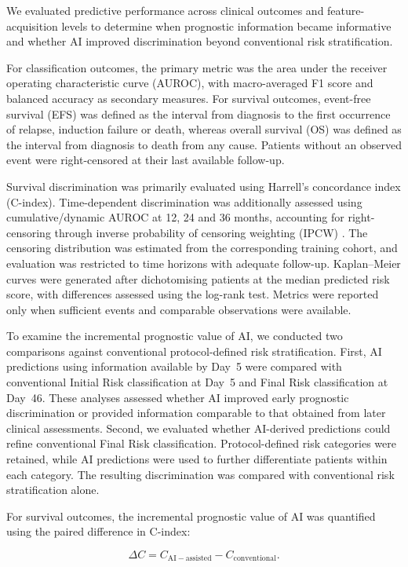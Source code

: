 \documentclass[pdflatex,sn-nature]{sn-jnl}
\begin{document}
We evaluated predictive performance across clinical outcomes and feature-acquisition levels to determine when prognostic information became informative and whether AI improved discrimination beyond conventional risk stratification.

For classification outcomes, the primary metric was the area under the receiver operating characteristic curve (AUROC), with macro-averaged F1 score and balanced accuracy as secondary measures. For survival outcomes, event-free survival (EFS) was defined as the interval from diagnosis to the first occurrence of relapse, induction failure or death, whereas overall survival (OS) was defined as the interval from diagnosis to death from any cause. Patients without an observed event were right-censored at their last available follow-up.

Survival discrimination was primarily evaluated using Harrell's concordance index (C-index). Time-dependent discrimination was additionally assessed using cumulative/dynamic AUROC at 12, 24 and 36 months, accounting for right-censoring through inverse probability of censoring weighting (IPCW) \cite{Uno2007}. The censoring distribution was estimated from the corresponding training cohort, and evaluation was restricted to time horizons with adequate follow-up. Kaplan--Meier curves were generated after dichotomising patients at the median predicted risk score, with differences assessed using the log-rank test. Metrics were reported only when sufficient events and comparable observations were available.

To examine the incremental prognostic value of AI, we conducted two comparisons against conventional protocol-defined risk stratification. First, AI predictions using information available by Day~5 were compared with conventional Initial Risk classification at Day~5 and Final Risk classification at Day~46. These analyses assessed whether AI improved early prognostic discrimination or provided information comparable to that obtained from later clinical assessments. Second, we evaluated whether AI-derived predictions could refine conventional Final Risk classification. Protocol-defined risk categories were retained, while AI predictions were used to further differentiate patients within each category. The resulting discrimination was compared with conventional risk stratification alone.

For survival outcomes, the incremental prognostic value of AI was quantified using the paired difference in C-index:

\begin{equation}
\Delta C =
C_{\mathrm{AI-assisted}} -
C_{\mathrm{conventional}}.
\label{eq:delta_c}
\end{equation}
\end{document}
